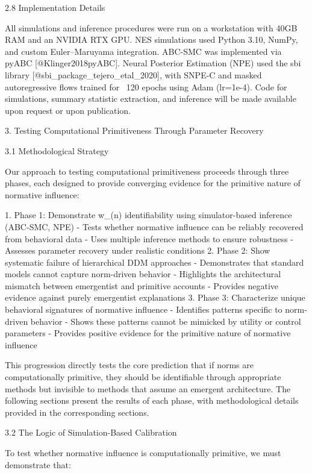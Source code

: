 2.8 Implementation Details

All simulations and inference procedures were run on a workstation with
40GB RAM and an NVIDIA RTX GPU. NES simulations used Python 3.10, NumPy,
and custom Euler–Maruyama integration. ABC-SMC was implemented via pyABC
[@Klinger2018pyABC]. Neural Posterior Estimation (NPE) used the sbi
library [@sbi_package_tejero_etal_2020], with SNPE-C and masked
autoregressive flows trained for ~120 epochs using Adam (lr=1e-4). Code
for simulations, summary statistic extraction, and inference will be
made available upon request or upon publication.

3. Testing Computational Primitiveness Through Parameter Recovery

3.1 Methodological Strategy

Our approach to testing computational primitiveness proceeds through
three phases, each designed to provide converging evidence for the
primitive nature of normative influence:

1.  Phase 1: Demonstrate w_(n) identifiability using simulator-based
    inference (ABC-SMC, NPE)
    - Tests whether normative influence can be reliably recovered from
      behavioral data
    - Uses multiple inference methods to ensure robustness
    - Assesses parameter recovery under realistic conditions
2.  Phase 2: Show systematic failure of hierarchical DDM approaches
    - Demonstrates that standard models cannot capture norm-driven
      behavior
    - Highlights the architectural mismatch between emergentist and
      primitive accounts
    - Provides negative evidence against purely emergentist explanations
3.  Phase 3: Characterize unique behavioral signatures of normative
    influence
    - Identifies patterns specific to norm-driven behavior
    - Shows these patterns cannot be mimicked by utility or control
      parameters
    - Provides positive evidence for the primitive nature of normative
      influence

This progression directly tests the core prediction that if norms are
computationally primitive, they should be identifiable through
appropriate methods but invisible to methods that assume an emergent
architecture. The following sections present the results of each phase,
with methodological details provided in the corresponding sections.

3.2 The Logic of Simulation-Based Calibration

To test whether normative influence is computationally primitive, we
must demonstrate that:

